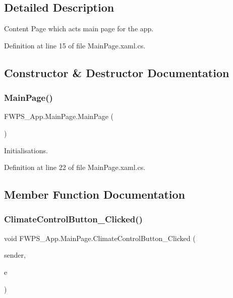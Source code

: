\subsection{Detailed Description}
Content Page which acts main page for the app. 

Definition at line 15 of file Main\+Page.\+xaml.\+cs.



\subsection{Constructor \& Destructor Documentation}
\mbox{\label{class_f_w_p_s___app_1_1_main_page_a039af339b590100ab2d4377b8382f61e}} 
\subsubsection{\texorpdfstring{Main\+Page()}{MainPage()}}
{\footnotesize\ttfamily F\+W\+P\+S\+\_\+\+App.\+Main\+Page.\+Main\+Page (\begin{DoxyParamCaption}{ }\end{DoxyParamCaption})}



Initialisations. 



Definition at line 22 of file Main\+Page.\+xaml.\+cs.



\subsection{Member Function Documentation}
\mbox{\label{class_f_w_p_s___app_1_1_main_page_afa5ef3c649e06aed7b433db975e1b1e9}} 
\subsubsection{\texorpdfstring{Climate\+Control\+Button\+\_\+\+Clicked()}{ClimateControlButton\_Clicked()}}
{\footnotesize\ttfamily void F\+W\+P\+S\+\_\+\+App.\+Main\+Page.\+Climate\+Control\+Button\+\_\+\+Clicked (\begin{DoxyParamCaption}\item[{object}]{sender,  }\item[{Event\+Args}]{e }\end{DoxyParamCaption})\hspace{0.3cm}{\ttfamily [private]}}

